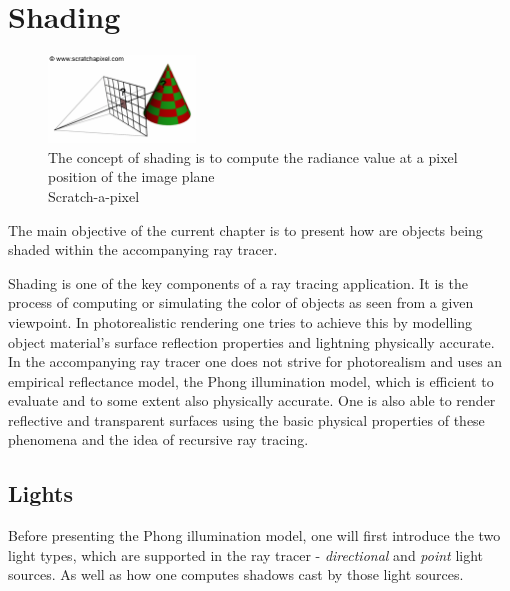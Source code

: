 \documentclass{article}
\begin{document}
\section{Shading}
\label{sec:shading}
\begin{figure}
    \centering
    \includegraphics[width=0.35\textwidth]{shading}
    \caption{The concept of shading is to compute the radiance value at a pixel position of the image plane \\Scratch-a-pixel}
    \label{fig:shading}
\end{figure}

The main objective of the current chapter is to present how are objects being shaded within the accompanying ray tracer. 

\vspace*{\baselineskip}

Shading is one of the key components of a ray tracing application. It is the process of computing or simulating the color of objects as seen from a given viewpoint. In photorealistic rendering one tries to achieve this by modelling object material's surface reflection properties and lightning physically accurate. In the accompanying ray tracer one does not strive for photorealism and uses an empirical reflectance model, the Phong illumination model, which is efficient to evaluate and to some extent also physically accurate. One is also able to render reflective and transparent surfaces using the basic physical properties of these phenomena and the idea of recursive ray tracing. 

\subsection{Lights}
Before presenting the Phong illumination model, one will first introduce the two light types, which are supported in the ray tracer - \textit{directional} and \textit{point} light sources. As well as how one computes shadows cast by those light sources. 
\end{document}
